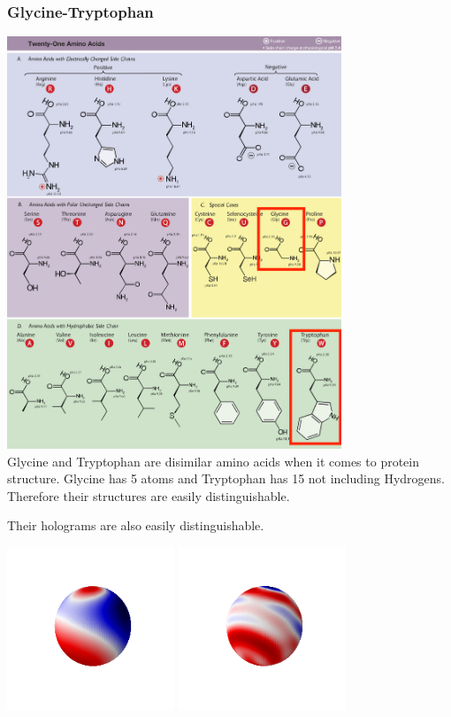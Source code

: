 \documentclass{article}
\begin{document}
\subsubsection{Glycine-Tryptophan}
\includegraphics[width=10cm]{Amino_Acids.svg.png}\\
Glycine and Tryptophan are disimilar amino acids when it comes to protein structure. Glycine has 5 atoms and Tryptophan has 15 not including Hydrogens. Therefore their structures are easily distinguishable.

Their holograms are also easily distinguishable.
\begin{center}
    \includegraphics[width=5cm]{GLY.png}
    \includegraphics[width=5cm]{TRP.png}\\
\end{center}
\end{document}
